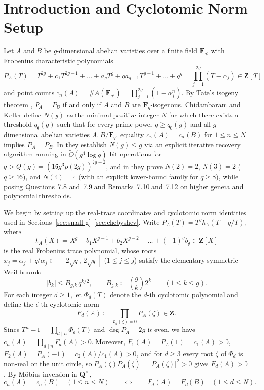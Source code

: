 \documentclass[11pt]{amsart}
\theoremstyle{remark}
\newcommand{\F}{\mathbf{F}}
\newcommand{\Z}{\mathbf{Z}}
\newcommand{\Q}{\mathbf{Q}}
\begin{document}
\maketitle

\section{Introduction and Cyclotomic Norm Setup}\label{sec:intro}

Let $A$ and $B$ be $g$-dimensional abelian varieties over a finite field $\F_q$, with Frobenius characteristic polynomials
\[
P_A(T) = T^{2g} + a_1 T^{2g-1} + \dots + a_g T^g + q a_{g-1} T^{g-1} + \dots + q^g = \prod_{j=1}^{2g} (T - \alpha_j) \in \Z[T]
\]
and point counts $c_n(A) = \#A(\F_{q^n}) = \prod_{j=1}^{2g}(1 - \alpha_j^n)$. By Tate's isogeny theorem \cite{Tat66}, $P_A = P_B$ if and only if $A$ and $B$ are $\F_q$-isogenous. Chidambaram and Keller \cite{CK26} define $N(g)$ as the minimal positive integer $N$ for which there exists a threshold $q_0(g)$ such that for every prime power $q \ge q_0(g)$ and all $g$-dimensional abelian varieties $A, B / \F_q$, equality $c_n(A) = c_n(B)$ for $1 \le n \le N$ implies $P_A = P_B$. In \cite[Theorem~1.1]{CK26} they establish $N(g) \le g$ via an explicit iterative recovery algorithm running in $\widetilde{O}(g^4 \log q)$ bit operations \cite{CKcode} for $q > Q(g) = (16 g^3 p(2g))^{2g+2}$, and in \cite[Section~7]{CK26} they prove $N(2) = 2$, $N(3) = 2$ ($q \ge 16$), and $N(4) = 4$ (with an explicit lower-bound family for $q \ge 8$), while posing Questions~7.8 and~7.9 and Remarks~7.10 and~7.12 on higher genera and polynomial thresholds.

We begin by setting up the real-trace coordinates and cyclotomic norm identities used in Sections~\ref{sec:small-g}--\ref{sec:chebyshev}. Write $P_A(T) = T^g h_A(T + q/T)$, where
\[
h_A(X) = X^g - b_1 X^{g-1} + b_2 X^{g-2} - \dots + (-1)^g b_g \in \Z[X]
\]
is the real Frobenius trace polynomial, whose roots $x_j = \alpha_j + q/\alpha_j \in [-2\sqrt{q},\, 2\sqrt{q}]$ ($1 \le j \le g$) satisfy the elementary symmetric Weil bounds
\begin{equation}\label{eq:weil-bk}
|b_k| \le B_{g,k}\, q^{k/2}, \qquad B_{g,k} \coloneqq \binom{g}{k} 2^k \qquad (1 \le k \le g).
\end{equation}
For each integer $d \ge 1$, let $\Phi_d(T)$ denote the $d$-th cyclotomic polynomial and define the $d$-th cyclotomic norm
\[
F_d(A) \coloneqq \prod_{\Phi_d(\zeta) = 0} P_A(\zeta) \in \Z.
\]
Since $T^n - 1 = \prod_{d \mid n} \Phi_d(T)$ and $\deg P_A = 2g$ is even, we have $c_n(A) = \prod_{d \mid n} F_d(A) > 0$. Moreover, $F_1(A) = P_A(1) = c_1(A) > 0$, $F_2(A) = P_A(-1) = c_2(A)/c_1(A) > 0$, and for $d \ge 3$ every root $\zeta$ of $\Phi_d$ is non-real on the unit circle, so $P_A(\zeta) P_A(\bar{\zeta}) = |P_A(\zeta)|^2 > 0$ gives $F_d(A) > 0$. By Möbius inversion in $\Q^\times$,
\begin{equation}\label{eq:Fd-equiv}
c_n(A) = c_n(B) \quad (1 \le n \le N) \qquad \Longleftrightarrow \qquad F_d(A) = F_d(B) \quad (1 \le d \le N).
\end{equation}
\end{document}

